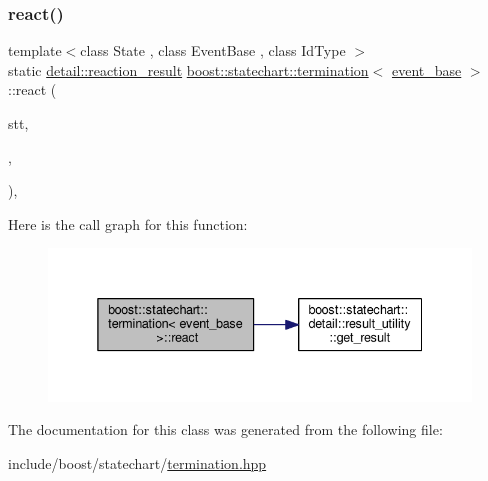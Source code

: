 \subsubsection{\texorpdfstring{react()}{react()}}
{\footnotesize\ttfamily template$<$class State , class Event\+Base , class Id\+Type $>$ \\
static \mbox{\hyperlink{namespaceboost_1_1statechart_1_1detail_ab091bbb4c29327fb46ee479ea1b7255b}{detail\+::reaction\+\_\+result}} \mbox{\hyperlink{classboost_1_1statechart_1_1termination}{boost\+::statechart\+::termination}}$<$ \mbox{\hyperlink{classboost_1_1statechart_1_1event__base}{event\+\_\+base}} $>$\+::react (\begin{DoxyParamCaption}\item[{State \&}]{stt,  }\item[{const Event\+Base \&}]{,  }\item[{const Id\+Type \&}]{ }\end{DoxyParamCaption})\hspace{0.3cm}{\ttfamily [inline]}, {\ttfamily [static]}}

Here is the call graph for this function\+:
\nopagebreak
\begin{figure}[H]
\begin{center}
\leavevmode
\includegraphics[width=338pt]{classboost_1_1statechart_1_1termination_3_01event__base_01_4_a1d3e0f812c5565e405314ed26cd7300c_cgraph}
\end{center}
\end{figure}


The documentation for this class was generated from the following file\+:\begin{DoxyCompactItemize}
\item 
include/boost/statechart/\mbox{\hyperlink{termination_8hpp}{termination.\+hpp}}\end{DoxyCompactItemize}

